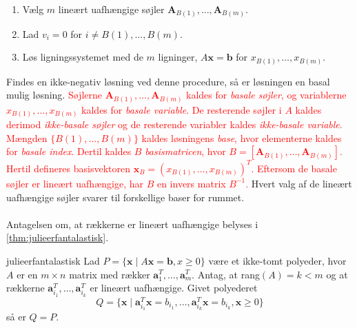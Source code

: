 %
\begin{enumerate}
\item Vælg $m$ lineært uafhængige søjler $\textbf{A}_{B(1)},\ldots,\textbf{A}_{B(m)}.$
\item Lad $v_i=0$ for $i \neq B(1),\ldots,B(m).$
\item Løs ligningssystemet med de $m$ ligninger, $A\textbf{x}=\textbf{b}$ for $x_{B(1)}, \ldots , x_{B(m)}.$
\end{enumerate}
%
Findes en ikke-negativ løsning ved denne procedure, så er løsningen en basal mulig løsning.
\textcolor{red}{Søjlerne $\textbf{A}_{B(1)},\ldots,\textbf{A}_{B(m)}$ kaldes for \textit{basale søjler}, og variablerne $x_{B(1)},\ldots,x_{B(m)}$ kaldes for \textit{basale variable}. De resterende søjler i $A$ kaldes derimod \textit{ikke-basale søjler} og de resterende variabler kaldes \textit{ikke-basale variable}. 
Mængden $\{ B(1),\ldots,B(m) \}$ kaldes løsningens \textit{base}, hvor elementerne kaldes for \textit{basale index}. 
Dertil kaldes $B$ \textit{basismatricen}, hvor $B= [ \textbf{A}_{B(1)},\ldots,\textbf{A}_{B(m)} ] $.
Hertil defineres basisvektoren $\mathbf{x}_B = ( x_{B(1)},\ldots,x_{B(m)})^T.$
Eftersom de basale søjler er lineært uafhængige, har $B$ en invers matrix $B^{-1}$. }
Hvert valg af de lineært uafhængige søjler svarer til forskellige baser for rummet.
\\\\
%
Antagelsen om, at rækkerne er lineært uafhængige belyses i \ref{thm:julieerfantalastisk}.
%
\begin{thm}{}{julieerfantalastisk}
Lad $P=\{\textbf{x} \mid  A\textbf{x}=\textbf{b},x \geq 0\}$ være et ikke-tomt polyeder, hvor $A$ er en $m \times n$ matrix med rækker $\textbf{a}^{T}_{1},\ldots,\textbf{a}^{T}_{m}$.
Antag, at rang$(A)=k<m$ og at rækkerne $\textbf{a}^T_{i_1},\ldots,\textbf{a}^T_{i_k}$ er lineært uafhængige. Givet polyederet 
$$Q=\{\textbf{x} \mid \textbf{a}^T_{i_1}\textbf{x}=b_{i_1},\ldots,\textbf{a}^T_{i_k}\textbf{x}=b_{i_k}, \textbf{x} \geq 0  \}$$ 
så er $Q=P$.
\end{thm}
